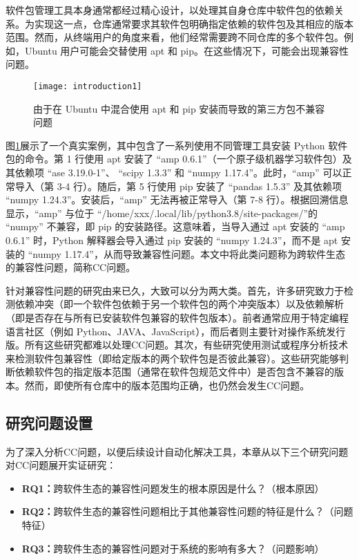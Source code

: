 软件包管理工具本身通常都经过精心设计，以处理其自身仓库中软件包的依赖关系。为实现这一点，仓库通常要求其软件包明确指定依赖的软件包及其相应的版本范围。然而，从终端用户的角度来看，他们经常需要跨不同仓库的多个软件包。例如，Ubuntu 用户可能会交替使用 apt 和 pip。在这些情况下，可能会出现兼容性问题。
\begin{figure}[htbp] %
	\centering
	\texttt{[image: introduction1]}
	\caption{由于在 Ubuntu 中混合使用 apt 和 pip 安装而导致的第三方包不兼容问题}
	\label{fig:example}
\end{figure}
图\ref{fig:example}展示了一个真实案例，其中包含了一系列使用不同管理工具安装 Python 软件包的命令。第 1 行使用 apt 安装了 “amp 0.6.1”（一个原子级机器学习软件包）及其依赖项 “ase 3.19.0-1”、 “scipy 1.3.3” 和 “numpy 1.17.4”。此时，“amp” 可以正常导入（第 3-4 行）。随后，第 5 行使用 pip 安装了 “pandas 1.5.3” 及其依赖项 “numpy 1.24.3”。安装后，“amp” 无法再被正常导入（第 7-8 行）。根据回溯信息显示，“amp” 与位于 “/home/xxx/.local/lib/python3.8/site-packages/”的 “numpy” 不兼容，即 pip 的安装路径。这意味着，当导入通过 apt 安装的 “amp 0.6.1” 时，Python 解释器会导入通过 pip 安装的 “numpy 1.24.3”，而不是 apt 安装的 “numpy 1.17.4”，从而导致兼容性问题。本文中将此类问题称为跨软件生态的兼容性问题，简称CC问题。

针对兼容性问题的研究由来已久，大致可以分为两大类。首先，许多研究致力于检测依赖冲突（即一个软件包依赖于另一个软件包的两个冲突版本）以及依赖解析（即是否存在与所有已安装软件包兼容的软件包版本）。前者通常应用于特定编程语言社区（例如 Python、JAVA、JavaScript），而后者则主要针对操作系统发行版。所有这些研究都难以处理CC问题。其次，有些研究使用测试或程序分析技术来检测软件包兼容性（即给定版本的两个软件包是否彼此兼容）。这些研究能够判断依赖软件包的指定版本范围（通常在软件包规范文件中）是否包含不兼容的版本。然而，即使所有仓库中的版本范围均正确，也仍然会发生CC问题。
\subsection{研究问题设置}
为了深入分析CC问题，以便后续设计自动化解决工具，本章从以下三个研究问题对CC问题展开实证研究：
\begin{itemize}
	\item \textbf{RQ1：}跨软件生态的兼容性问题发生的根本原因是什么？（根本原因）
	\item \textbf{RQ2：}跨软件生态的兼容性问题相比于其他兼容性问题的特征是什么？（问题特征）
	\item \textbf{RQ3：}跨软件生态的兼容性问题对于系统的影响有多大？（问题影响）
\end{itemize}

